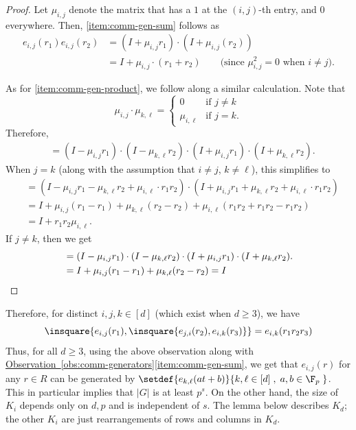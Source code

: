 \documentclass[11pt]{article}
\newcommand{\expref}[2]{\texorpdfstring{\hyperref[#2]{#1~\ref{#2}}}{#1~\ref{#2}}}
\begin{document}
\begin{proof}
  Let $\mu_{i,j}$ denote the matrix that has a $1$ at the $(i,j)$-th entry, and $0$ everywhere. Then, \eqref{item:comm-gen-sum} follows as
  \begin{align*}
    e_{i,j}(r_1) e_{i,j}(r_2) &= (I + \mu_{i,j} r_1) \cdot (I + \mu_{i,j}(r_2))\\
    & = I + \mu_{i,j} \cdot (r_1 + r_2)\qquad\text{(since $\mu_{i,j}^2 = 0$ when $i\neq j$)}.
  \end{align*}

  As for \eqref{item:comm-gen-product}, we follow along a similar calculation. Note that 
  \[
  \mu_{i,j} \cdot \mu_{k,\ell} = \begin{cases} 0 & \text{if $j\neq k$}\\ \mu_{i,\ell} & \text{if $j = k$}.\end{cases}
  \]
  Therefore, 
  \begin{align*}
    [e_{i,j}(r_1), e_{k,\ell}(r_2)] & = (I - \mu_{i,j} r_1)\cdot (I - \mu_{k,\ell}r_2) \cdot (I + \mu_{i,j} r_1)\cdot (I + \mu_{k,\ell}r_2).
  \end{align*}
  When $j = k$ (along with the assumption that $i\neq j$, $k\neq \ell$), this simplifies to
  \begin{align*}
    [e_{i,j}(r_1), e_{k,\ell}(r_2)] &= (I - \mu_{i,j}r_1 - \mu_{k,\ell}r_2 + \mu_{i,\ell} \cdot r_1r_2) \cdot (I + \mu_{i,j}r_1 + \mu_{k,\ell}r_2 + \mu_{i,\ell} \cdot r_1r_2)\\
    & = I + \mu_{i,j}(r_1 - r_1) + \mu_{k,\ell}(r_2 - r_2) + \mu_{i,\ell}(r_1r_2 + r_1r_2 - r_1r_2)\\
    & = I + r_1r_2 \mu_{i,\ell}.
  \end{align*}
  If $j \neq k$, then we get
  \begin{align*}
  [e_{i,j}(r_1), e_{k,\ell}(r_2)] & = (I - \mu_{i,j} r_1)\cdot (I - \mu_{k,\ell}r_2) \cdot (I + \mu_{i,j} r_1)\cdot (I + \mu_{k,\ell}r_2).\\
  & = I + \mu_{i,j}(r_1 - r_1) + \mu_{k,\ell}(r_2 - r_2) = I\qedhere
  \end{align*}
\end{proof}

\noindent 
Therefore, for distinct $i,j,k \in [d]$ (which exist when $d\geq 3$), we have
\[
  \insquare{e_{i,j}(r_1), \insquare{e_{j,i}(r_2), e_{i,k}(r_3)}} = e_{i,k}(r_1r_2r_3)
\]
Thus, for all $d \geq 3$, using the above observation along with \expref{Observation}{obs:comm-generators}\eqref{item:comm-gen-sum}, we get that $e_{i,j}(r)$ for any $r\in R$ can be generated by $\setdef{e_{k,\ell}(at + b)}{k,\ell \in [d]\;,\; a,b\in \F_p\;}$. 
This in particular implies that $|G|$ is at least $p^s$.
On the other hand, the size of $K_i$ depends only on $d,p$ and is independent of $s$.
The lemma below describes $K_d$; the other %
$K_i$  %
are just rearrangements of rows and columns in $K_d$.
\end{document}
